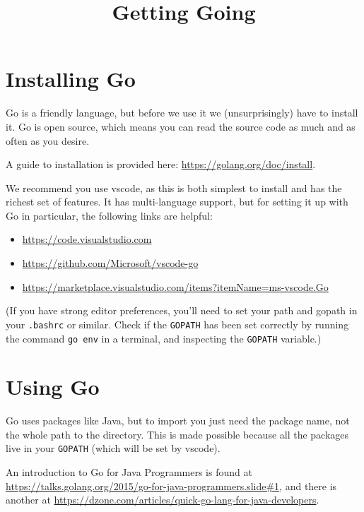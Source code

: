 \documentclass[8pt]{article}
\title{Getting Going}
\date{}
\begin{document}
\maketitle
\section{Installing Go}

Go is a friendly language, but before we use it we (unsurprisingly) have to install it.
Go is open source, which means you can read the source code as much and as often as you desire.

A guide to installation is provided here: \url{https://golang.org/doc/install}.

We recommend you use vscode, as this is both simplest to install and has the richest set of
features. It has multi-language support, but for setting it up with Go in particular, the
following links are helpful:
\begin{itemize}
  \item \url{https://code.visualstudio.com}
  \item \url{https://github.com/Microsoft/vscode-go}
  \item  \url{https://marketplace.visualstudio.com/items?itemName=ms-vscode.Go}
\end{itemize}

(If you have strong editor preferences, you'll need to set your path and gopath in your 
\texttt{.bashrc} or similar. Check if the \texttt{GOPATH} has been set
correctly by running the command \texttt{go env} in a terminal, and inspecting the \texttt{GOPATH} variable.)

\section{Using Go}

Go uses packages like Java, but to import you just need the package name, not the whole path to the directory.
This is made possible because all the packages live in your \texttt{GOPATH} (which will be set by vscode).

An introduction to Go for Java Programmers is found at \url{https://talks.golang.org/2015/go-for-java-programmers.slide#1},
and there is another at
\url{https://dzone.com/articles/quick-go-lang-for-java-developers}.
\end{document}
